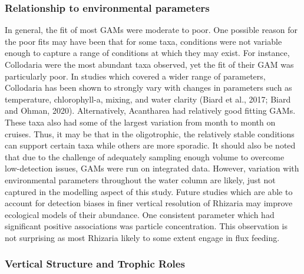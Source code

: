 \documentclass[
]{article}
\begin{document}
\subsubsection{Relationship to environmental
parameters}\label{relationship-to-environmental-parameters}

In general, the fit of most GAMs were moderate to poor. One possible
reason for the poor fits may have been that for some taxa, conditions
were not variable enough to capture a range of conditions at which they
may exist. For instance, Collodaria were the most abundant taxa
observed, yet the fit of their GAM was particularly poor. In studies
which covered a wider range of parameters, Collodaria has been shown to
strongly vary with changes in parameters such as temperature,
chlorophyll-a, mixing, and water clarity (Biard et al., 2017; Biard and
Ohman, 2020). Alternatively, Acantharea had relatively good fitting
GAMs. These taxa also had some of the largest variation from month to
month on cruises. Thus, it may be that in the oligotrophic, the
relatively stable conditions can support certain taxa while others are
more sporadic. It should also be noted that due to the challenge of
adequately sampling enough volume to overcome low-detection issues, GAMs
were run on integrated data. However, variation with environmental
parameters throughout the water column are likely, just not captured in
the modelling aspect of this study. Future studies which are able to
account for detection biases in finer vertical resolution of Rhizaria
may improve ecological models of their abundance. One consistent
parameter which had significant positive associations was particle
concentration. This observation is not surprising as most Rhizaria
likely to some extent engage in flux feeding.

\subsubsection{Vertical Structure and Trophic
Roles}\label{vertical-structure-and-trophic-roles}
\end{document}
